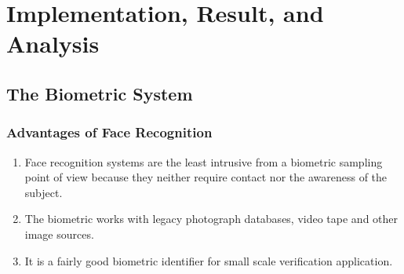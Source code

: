 
\chapter{Implementation, Result, and Analysis}



\newpage



\section{The Biometric System}

\subsection{Advantages of Face Recognition}

\begin{enumerate}
  \item Face recognition systems are the least intrusive from a biometric sampling point of view because they neither require contact nor the awareness of the subject.
  \item The biometric works with legacy photograph databases, video tape and other image sources.
  \item It is a fairly good biometric identifier for small scale verification application.
\end{enumerate}

